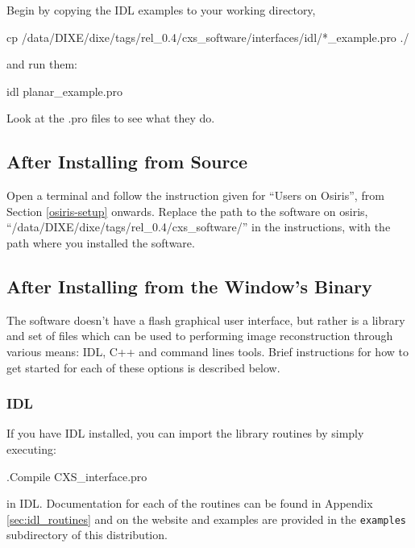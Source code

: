 \documentclass[]{cxs-software}
\begin{document}
Begin by copying the IDL examples to your working directory, 
\begin{myverbatim}
   cp /data/DIXE/dixe/tags/rel_0.4/cxs_software/interfaces/idl/*_example.pro ./ 
\end{myverbatim}
and run them: 
\begin{myverbatim}
   idl planar_example.pro
\end{myverbatim}

Look at the .pro files to see what they do. 


\subsection{After Installing from Source}

Open a terminal and follow the instruction given for ``Users on
Osiris'', from Section \ref{osiris-setup} onwards. Replace the path to
the software on osiris,
``/data/DIXE/dixe/tags/rel\_0.4/cxs\_software/'' in the instructions,
with the path where you installed the software.

\subsection{After Installing from the Window's Binary}

The software doesn't have a flash graphical user interface, but rather
is a library and set of files which can be used to performing image
reconstruction through various means: IDL, C++ and command lines
tools. Brief instructions for how to get started for each of these
options is described below.

\subsubsection{IDL}
If you have IDL installed, you can import the library routines by
simply executing:
\begin{myverbatim}
   .Compile CXS_interface.pro
\end{myverbatim}
in IDL. Documentation for each of the routines can be found in
Appendix \ref{sec:idl_routines} and on the website and examples are
provided in the {\tt examples} subdirectory of this distribution.
\end{document}
